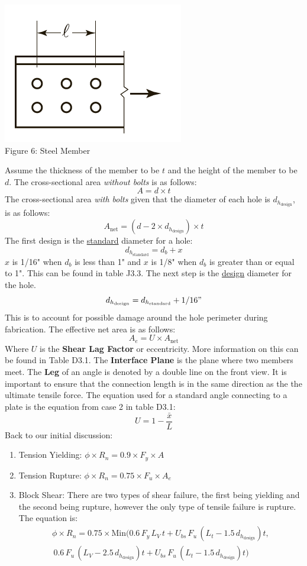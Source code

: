 \documentclass{article}
\begin{document}
\begin{center}
    \vspace{3mm}
    \includegraphics[scale=0.7]{fig6.png}
    \vspace{3mm}
    \\Figure 6: Steel Member
\end{center}
\newpage
\noindent Assume the thickness of the member to be $t$ and the height of the member to be $d$. The cross-sectional area \emph{without bolts} is as follows: 
\[A = d\times t\] 
The cross-sectional area \emph{with bolts} given that the diameter of each hole is $d_{h_\text{design}}$, is as follows: 
\[A_\text{net} = (d-2\times d_{h_\text{design}})\times t\] 
The first design is the \underline{standard} diameter for a hole: 
\[d_{h_\text{standard}}=d_b+x\] 
$x$ is 1/16" when $d_b$ is less than 1" and $x$ is 1/8" when $d_b$ is greater than or equal to 1". This can be found in table J3.3. The next step is the \underline{design} diameter for the hole. 
\[d_{h_\text{design}}=d_{h_\text{standard}}+1/16"\] 
This is to account for possible damage around the hole perimeter during fabrication.  The effective net area is as follows: 
\[A_e=U\times A_\text{net}\] 
Where $U$ is the \textbf{Shear Lag Factor} or eccentricity. More information on this can be found in Table D3.1. The \textbf{Interface Plane} is the plane where two members meet. The \textbf{Leg} of an angle is denoted by a double line on the front view. It is important to ensure that the connection length is in the same direction as the the ultimate tensile force. The equation used for a standard angle connecting to a plate is the equation from case 2 in table D3.1: 
\[U=1-\frac{\bar{x}}{L}\] 
Back to our initial discussion: 
\begin{enumerate}
    \item Tension Yielding: \(\phi\times R_n = 0.9\times F_y\times A\) 
    \item Tension Rupture: \(\phi\times R_n = 0.75\times F_u\times A_e\)
    \item Block Shear: There are two types of shear failure, the first being yielding and the second being rupture, however the only type of tensile failure is rupture. The equation is: 
    \begin{multline*} \phi\times R_n=0.75\times \text{Min}(0.6\,F_y\,L_V\,t+U_{bs}\,F_u\,(L_t-1.5\,d_{h_\text{design}})t,\\\, 0.6\,F_u\,(L_V-2.5\,d_{h_\text{design}})t+U_{bs}\,F_u\,(L_t-1.5\,d_{h_\text{design}})t)
    \end{multline*}
\end{enumerate}
\end{document}
